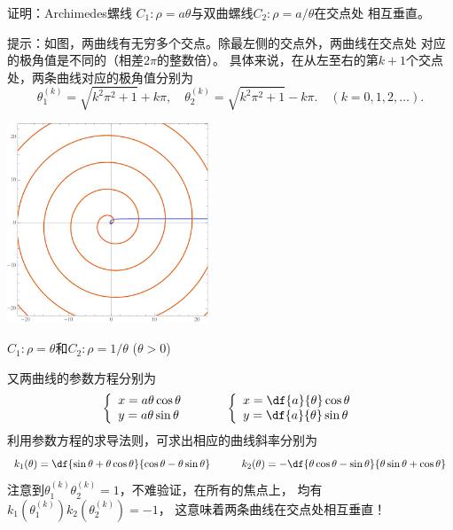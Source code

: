 \begin{shaded}
	\egz 证明：{\kaishu Archimedes螺线}
	$C_1:\rho=a\theta$与双曲螺线$C_2:\rho=a/\theta$在交点处
	相互垂直。

	提示：如图，两曲线有无穷多个交点。除最左侧的交点外，两曲线在交点处
	对应的极角值是不同的（相差$2\pi$的整数倍）。
	具体来说，在从左至右的第$k+1$个交点处，两条曲线对应的极角值分别为
	$$\theta_1^{(k)}=\sqrt{k^2\pi^2+1}+k\pi,
	\quad \theta_2^{(k)}=\sqrt{k^2\pi^2+1}-k\pi.
	\quad (k=0,1,2,\ldots).$$
	\begin{center}
		\includegraphics[width=0.45\textwidth]
		{./images/ch02/arCurve.pdf}
		
		{\kaishu$C_1:\rho=\theta$和$C_2:\rho=1/\theta$
		\quad($\theta>0$)
		}
	\end{center}
	又两曲线的参数方程分别为
	$$
	\left\{\begin{array}{l}
		x=a\theta\cos\theta\\
		y=a\theta\sin\theta
	\end{array}\right.
	\quad\quad\quad
	\left\{\begin{array}{l}
		x=\df{a}{\theta}\cos\theta\\
		y=\df{a}{\theta}\sin\theta
	\end{array}\right.
	$$
	利用参数方程的求导法则，可求出相应的曲线斜率分别为
	$$k_1(\theta)=\df{\sin\theta+\theta\cos\theta}{\cos\theta-\theta\sin\theta}
	\quad\quad\quad
	k_2(\theta)=-\df{\theta\cos\theta-\sin\theta}{\theta\sin\theta+\cos\theta}
	$$
	注意到$\theta_1^{(k)}\theta_2^{(k)}=1$，不难验证，在所有的焦点上，
	均有$k_1(\theta_1^{(k)})k_2(\theta_2^{(k)})=-1$，
	这意味着两条曲线在交点处相互垂直！
\end{shaded}

